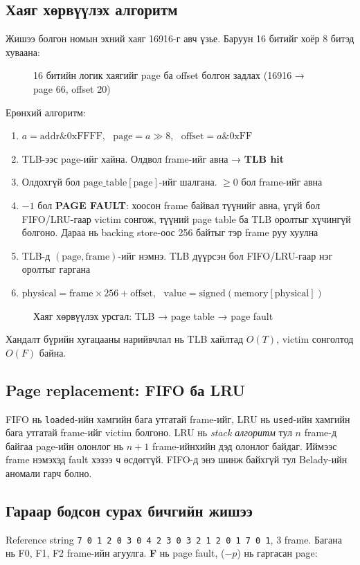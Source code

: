 \subsection{Хаяг хөрвүүлэх алгоритм}
Жишээ болгон номын эхний хаяг 16916-г авч үзье. Баруун 16 битийг хоёр 8 битэд хуваана:
\begin{figure}[H]\centering\resizebox{\linewidth}{!}{\addrsplit}
\caption{16 битийн логик хаягийг page ба offset болгон задлах (16916 → page 66, offset 20)}\end{figure}
Ерөнхий алгоритм:
\begin{enumerate}
\item $a = \text{addr} \mathbin{\&} \text{0xFFFF}$, \ $\text{page} = a \gg 8$, \ $\text{offset} = a \mathbin{\&} \text{0xFF}$
\item TLB-ээс page-ийг хайна. Олдвол frame-ийг авна → \textbf{TLB hit}
\item Олдохгүй бол $\text{page\_table}[\text{page}]$-ийг шалгана. $\ge 0$ бол frame-ийг авна
\item $-1$ бол \textbf{PAGE FAULT}: хоосон frame байвал түүнийг авна, үгүй бол FIFO/LRU-гаар victim сонгож, түүний page table ба TLB оролтыг хүчингүй болгоно. Дараа нь backing store-оос 256 байтыг тэр frame руу хуулна
\item TLB-д $(\text{page},\text{frame})$-ийг нэмнэ. TLB дүүрсэн бол FIFO/LRU-гаар нэг оролтыг гаргана
\item $\text{physical} = \text{frame}\times256 + \text{offset}$, \ $\text{value} = \text{signed}(\text{memory}[\text{physical}])$
\end{enumerate}
\begin{figure}[H]\centering\resizebox{\linewidth}{!}{\translationflow}
\caption{Хаяг хөрвүүлэх урсгал: TLB → page table → page fault}\end{figure}
Хандалт бүрийн хугацааны нарийвчлал нь TLB хайлтад $O(T)$, victim сонголтод $O(F)$ байна.

\subsection{Page replacement: FIFO ба LRU}
FIFO нь \texttt{loaded}-ийн хамгийн бага утгатай frame-ийг, LRU нь \texttt{used}-ийн хамгийн бага утгатай frame-ийг victim болгоно. LRU нь \textit{stack алгоритм} тул $n$ frame-д байгаа page-ийн олонлог нь $n+1$ frame-ийнхийн дэд олонлог байдаг. Иймээс frame нэмэхэд fault хэзээ ч өсдөггүй. FIFO-д энэ шинж байхгүй тул Belady-ийн аномали гарч болно.

\subsection{Гараар бодсон сурах бичгийн жишээ}
Reference string \texttt{7 0 1 2 0 3 0 4 2 3 0 3 2 1 2 0 1 7 0 1}, 3 frame. Багана нь F0, F1, F2 frame-ийн агуулга. \textbf{F} нь page fault, ($-p$) нь гаргасан page:

